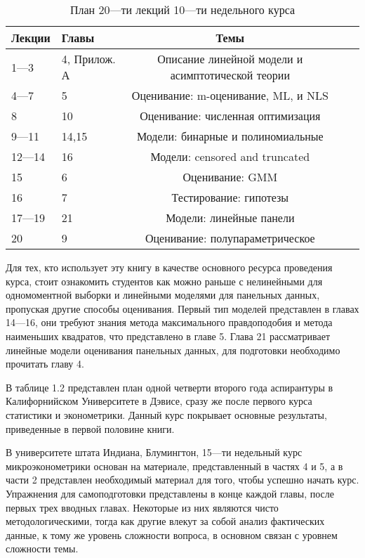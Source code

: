 \begin{table}[h]
\begin{center}
\caption{\label{tab:pred}План 20---ти лекций 10---ти недельного курса}
\begin{tabular}[t]{llcll|}
\hline
\bf{Лекции} & \bf{Главы} & \bf{Темы} \\
\hline
1---3 & 4, Прилож. А & Описание линейной модели и асимптотической теории \\
4---7 & 5 & Оценивание: m-оценивание, ML, и NLS\\
8 & 10 & Оценивание: численная оптимизация \\
9---11 & 14,15 & Модели: бинарные и полиномиальные \\
12---14 & 16 & Модели: censored and truncated \\
15 & 6 & Оценивание: GMM \\
16 & 7 & Тестирование: гипотезы \\
17---19 & 21 & Модели: линейные панели \\
20 & 9 & Оценивание: полупараметрическое \\
\hline
\end{tabular}
\end{center}
\end{table}
	
	Для тех, кто использует эту книгу в качестве основного ресурса проведения курса, стоит ознакомить студентов как можно раньше с нелинейными для одномоментной выборки и линейными моделями для панельных данных, пропуская другие способы оценивания. Первый тип моделей представлен в главах 14---16, они требуют знания метода максимального правдоподобия и метода наименьших квадратов, что представлено в главе 5. Глава 21 рассматривает линейные модели оценивания панельных данных, для подготовки необходимо прочитать главу 4.
	
	
	В таблице 1.2 представлен план одной четверти второго года аспирантуры в Калифорнийском Университете в Дэвисе, сразу же после первого курса статистики и эконометрики. Данный курс покрывает основные результаты, приведенные в первой половине книги. 
	
	
	В университете штата Индиана, Блумингтон, 15---ти недельный курс микроэконометрики основан на материале, представленный в частях 4 и 5, а в части 2 представлен необходимый материал для того, чтобы успешно начать курс.
	Упражнения для самоподготовки представлены в конце каждой главы, после первых трех вводных главах. Некоторые из них являются чисто методологическими, тогда как другие влекут за собой анализ фактических данные, к тому же уровень сложности вопроса, в основном связан с уровнем сложности темы.
	
